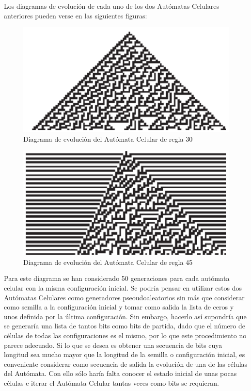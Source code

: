 Los diagramas de evolución de cada uno de los dos Autómatas Celulares anteriores pueden verse en las siguientes figuras:

\begin{figure}[H]
\centering
\includegraphics[scale=0.7]{imagenes/regla_30.png}
\caption{Diagrama de evolución del Autómata Celular de regla 30}
\end{figure}


\begin{figure}[H]
\centering
\includegraphics[scale=0.7]{imagenes/regla_45.png}
\caption{Diagrama de evolución del Autómata Celular de regla 45}
\end{figure}

Para este diagrama se han considerado 50 generaciones para cada autómata celular con la misma configuración inicial. Se podría pensar en utilizar estos dos Autómatas Celulares como generadores pseoudoaleatorios sin más que considerar como semilla a la configuración inicial y tomar como salida la lista de ceros y unos definida por la última configuración. Sin embargo, hacerlo así supondría que se generaría una lista de tantos bits  como bits de partida, dado que el número de células de todas las configuraciones es el mismo, por lo que este procedimiento no parece adecuado. Si lo que se desea es obtener una secuencia de bits cuya longitud sea mucho mayor que la longitud de la semilla o configuración inicial, es conveniente considerar como secuencia de salida la evolución de una de las células del Autómata. Con ello sólo haría falta conocer el estado inicial de unas pocas células e iterar el Autómata Celular tantas veces como bits se requieran.\\


